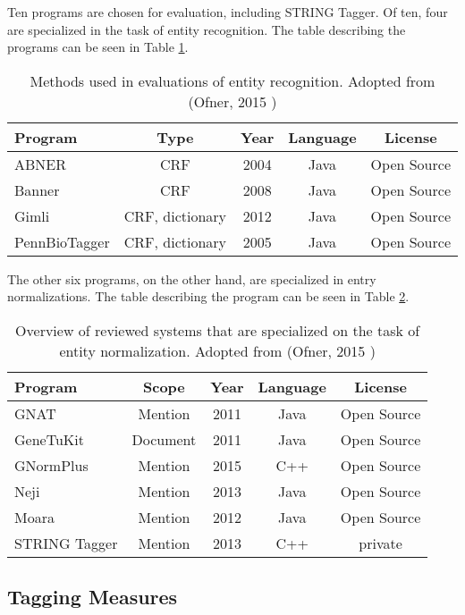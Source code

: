 Ten programs are chosen for evaluation, including STRING Tagger. Of ten, four are specialized in the task of entity recognition. The table describing the programs can be seen in Table \ref{fig:TaggingMethods}.

\begin{table}[htbp]
\caption{Methods used in evaluations of entity recognition. Adopted from (Ofner, 2015 \citep{ofner2015evaluation})}
\centering
\begin{tabular}{ l c c c c }
  \hline
  Program & Type & Year & Language & License\\
  \hline
  \hline
  ABNER & CRF & 2004 & Java & Open Source\\
  \hline
  Banner & CRF & 2008 & Java & Open Source\\
  \hline
  Gimli & CRF, dictionary & 2012 & Java & Open Source\\
  \hline
  PennBioTagger & CRF, dictionary & 2005 & Java & Open Source\\
  \hline
\end{tabular}
  \label{fig:TaggingMethods}
\end{table}

The other six programs, on the other hand, are specialized in entry normalizations. The table describing the program can be seen in Table \ref{fig:NormalizationMethods}.

\begin{table}[htbp]
\caption{Overview of reviewed systems that are specialized on the task of entity normalization. Adopted from (Ofner, 2015 \citep{ofner2015evaluation})}
\centering
\begin{tabular}{ l c c c c }
  \hline
  Program & Scope & Year & Language & License\\
  \hline
  \hline
  GNAT & Mention & 2011 & Java & Open Source\\
  \hline
  GeneTuKit & Document & 2011 & Java & Open Source\\
  \hline
  GNormPlus & Mention & 2015 & C++ & Open Source\\
  \hline
  Neji & Mention & 2013 & Java & Open Source\\
  \hline
  Moara & Mention & 2012 & Java & Open Source\\
  \hline
  STRING Tagger & Mention & 2013 & C++ & private\\
  \hline
\end{tabular}
  \label{fig:NormalizationMethods}
\end{table}

\subsection{Tagging Measures}

